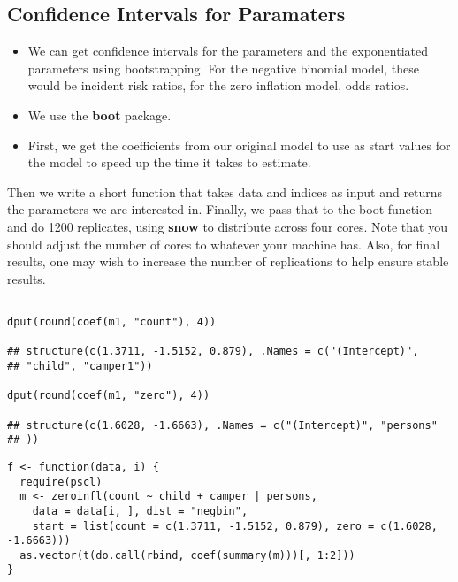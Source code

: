 \documentclass[MASTER.tex]{subfiles}
\begin{document}
\subsection*{Confidence Intervals for Paramaters}
\begin{frame}
\begin{itemize}
\item We can get confidence intervals for the parameters and the exponentiated parameters using bootstrapping. For the negative binomial model, these would be incident risk ratios, for the zero inflation model, odds ratios. 
\item We use the \textbf{boot} package.
\item First, we get the coefficients from our original model to use as start values for the model to speed up the time it takes to estimate.
\end{itemize}


\end{frame}
\begin{frame}
 Then we write a short function that takes data and indices as input and returns the parameters we are interested in. Finally, we pass that to the boot function and do 1200 replicates, using \textbf{snow} to distribute across four cores. Note that you should adjust the number of cores to whatever your machine has. Also, for final results, one may wish to increase the number of replications to help ensure stable results.
\end{frame}
\begin{frame}[fragile]
\begin{verbatim}

dput(round(coef(m1, "count"), 4))
 
## structure(c(1.3711, -1.5152, 0.879), .Names = c("(Intercept)", 
## "child", "camper1"))
 
dput(round(coef(m1, "zero"), 4))
 
## structure(c(1.6028, -1.6663), .Names = c("(Intercept)", "persons"
## ))

\end{verbatim}
\end{frame}
\begin{frame}[fragile]
\begin{verbatim}
f <- function(data, i) {
  require(pscl)
  m <- zeroinfl(count ~ child + camper | persons,
    data = data[i, ], dist = "negbin",
    start = list(count = c(1.3711, -1.5152, 0.879), zero = c(1.6028, -1.6663)))
  as.vector(t(do.call(rbind, coef(summary(m)))[, 1:2]))
}

\end{verbatim}
\end{frame}
\end{document}
